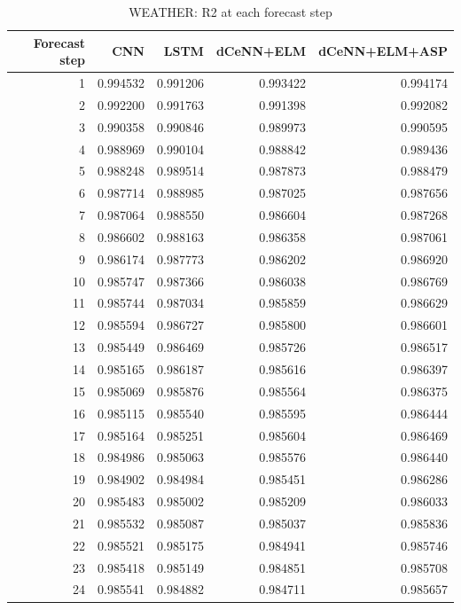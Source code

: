 \begin{table}
\caption{WEATHER: R2 at each forecast step}
\begin{tabular}{rrrrr}
\toprule
Forecast step & CNN & LSTM & dCeNN+ELM & dCeNN+ELM+ASP \\
\midrule
1 & 0.994532 & 0.991206 & 0.993422 & 0.994174 \\
2 & 0.992200 & 0.991763 & 0.991398 & 0.992082 \\
3 & 0.990358 & 0.990846 & 0.989973 & 0.990595 \\
4 & 0.988969 & 0.990104 & 0.988842 & 0.989436 \\
5 & 0.988248 & 0.989514 & 0.987873 & 0.988479 \\
6 & 0.987714 & 0.988985 & 0.987025 & 0.987656 \\
7 & 0.987064 & 0.988550 & 0.986604 & 0.987268 \\
8 & 0.986602 & 0.988163 & 0.986358 & 0.987061 \\
9 & 0.986174 & 0.987773 & 0.986202 & 0.986920 \\
10 & 0.985747 & 0.987366 & 0.986038 & 0.986769 \\
11 & 0.985744 & 0.987034 & 0.985859 & 0.986629 \\
12 & 0.985594 & 0.986727 & 0.985800 & 0.986601 \\
13 & 0.985449 & 0.986469 & 0.985726 & 0.986517 \\
14 & 0.985165 & 0.986187 & 0.985616 & 0.986397 \\
15 & 0.985069 & 0.985876 & 0.985564 & 0.986375 \\
16 & 0.985115 & 0.985540 & 0.985595 & 0.986444 \\
17 & 0.985164 & 0.985251 & 0.985604 & 0.986469 \\
18 & 0.984986 & 0.985063 & 0.985576 & 0.986440 \\
19 & 0.984902 & 0.984984 & 0.985451 & 0.986286 \\
20 & 0.985483 & 0.985002 & 0.985209 & 0.986033 \\
21 & 0.985532 & 0.985087 & 0.985037 & 0.985836 \\
22 & 0.985521 & 0.985175 & 0.984941 & 0.985746 \\
23 & 0.985418 & 0.985149 & 0.984851 & 0.985708 \\
24 & 0.985541 & 0.984882 & 0.984711 & 0.985657 \\
\bottomrule
\end{tabular}
\end{table}
